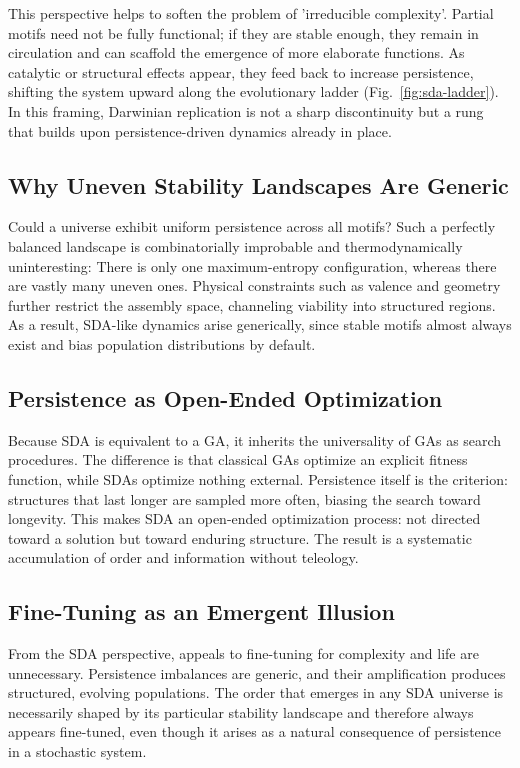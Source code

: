 \documentclass[life,article,submit,pdftex,moreauthors]{Definitions/mdpi}
\begin{document}
This perspective helps to soften the problem of 'irreducible complexity'.  
Partial motifs need not be fully functional; if they are stable enough, they remain in circulation and
can scaffold the emergence of more elaborate functions.  
As catalytic or structural effects appear, they feed back to increase persistence, shifting the system
upward along the evolutionary ladder (Fig.~\ref{fig:sda-ladder}).  
In this framing, Darwinian replication is not a sharp discontinuity but a rung that builds upon persistence-driven dynamics already in place.


\subsection{Why Uneven Stability Landscapes Are Generic}

Could a universe exhibit uniform persistence across all motifs? Such a
perfectly balanced landscape is combinatorially improbable and thermodynamically uninteresting: There is only one maximum-entropy configuration, whereas there are vastly many uneven ones. Physical constraints
such as valence and geometry further restrict the assembly space, channeling
viability into structured regions. As a result, SDA-like dynamics arise
generically, since stable motifs almost always exist and bias population
distributions by default.


\subsection{Persistence as Open-Ended Optimization}
Because SDA is equivalent to a GA, it inherits the universality of GAs as search procedures. 
The difference is that classical GAs optimize an explicit fitness function, while SDAs optimize nothing external. 
Persistence itself is the criterion: structures that last longer are sampled more often, biasing the search toward longevity. This makes SDA an open-ended optimization process: not directed toward a solution but toward enduring structure. 
The result is a systematic accumulation of order and information without teleology.  

\subsection{Fine-Tuning as an Emergent Illusion}

From the SDA perspective, appeals to fine-tuning for complexity and life
\cite{rees2000six, davies2006goldilocks} are unnecessary. Persistence
imbalances are generic, and their amplification produces structured, evolving
populations. The order that emerges in any SDA universe is necessarily
shaped by its particular stability landscape and therefore always appears
fine-tuned, even though it arises as a natural consequence of persistence in
a stochastic system.
\end{document}
